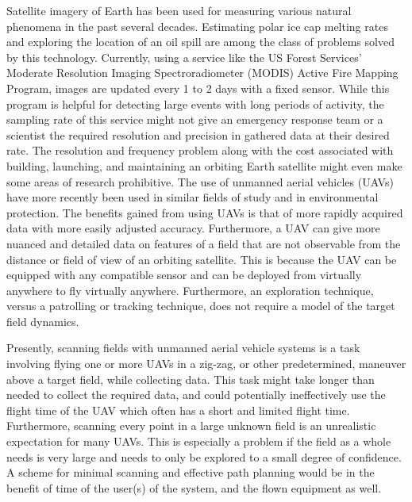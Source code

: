 \documentclass[11pt]{ucthesis}
\begin{document}
Satellite imagery of Earth has been used for measuring various natural phenomena in the past several decades. Estimating polar ice cap melting rates and exploring the location of an oil spill are among the class of problems solved by this technology. Currently, using a service like the US Forest Services' Moderate Resolution Imaging Spectroradiometer (MODIS) Active Fire Mapping Program, images are updated every 1 to 2 days with a fixed sensor. While this program is helpful for detecting large events with long periods of activity, the sampling rate of this service might not give an emergency response team or a scientist the required resolution and precision in gathered data at their desired rate. The resolution and frequency problem along with the cost associated with building, launching, and maintaining an orbiting Earth satellite might even make some areas of research prohibitive. The use of unmanned aerial vehicles (UAVs) have more recently been used in similar fields of study and in environmental protection. The benefits gained from using UAVs is that of more rapidly acquired data with more easily adjusted accuracy. Furthermore, a UAV can give more nuanced and detailed data on features of a field that are not observable from the distance or field of view of an orbiting satellite. This is because the UAV can be equipped with any compatible sensor and can be deployed from virtually anywhere to fly virtually anywhere. Furthermore, an exploration technique, versus a patrolling or tracking technique, does not require a model of the target field dynamics.

Presently, scanning fields with unmanned aerial vehicle systems is a task involving flying one or more UAVs in a zig-zag, or other predetermined, maneuver above a target field, while collecting data. This task might take longer than needed to collect the required data, and could potentially ineffectively use the flight time of the UAV which often has a short and limited flight time. Furthermore, scanning every point in a large unknown field is an unrealistic expectation for many UAVs. This is especially a problem if the field as a whole needs is very large and needs to only be explored to a small degree of confidence. A scheme for minimal scanning and effective path planning would be in the benefit of time of the user(s) of the system, and the flown equipment as well. 
\end{document}
